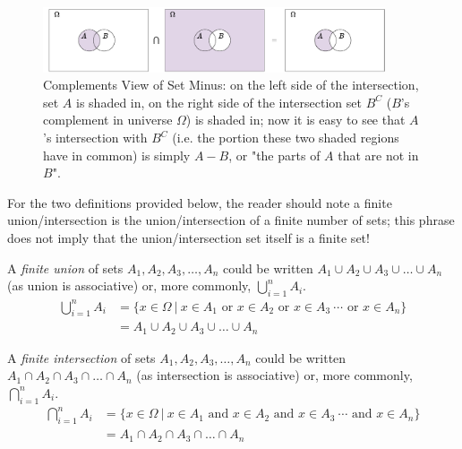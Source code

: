 \begin{figure}[h!]
    \centering
    \includegraphics[width=0.9\textwidth]{Figures/Complements View of Set Minus.pdf}
    \caption{Complements View of Set Minus: on the left side of the intersection, set $A$ is shaded in, on the right side of the intersection set $B^C$ ($B$'s complement in universe $\Omega$) is shaded in; now it is easy to see that $A$'s intersection with $B^C$ (i.e. the portion these two shaded regions have in common) is simply $A-B$, or "the parts of $A$ that are not in $B$".}
    \label{fig:complements_view_set_minus}
\end{figure}
\newpage
\noindent For the two definitions provided below, the reader should note a finite union/intersection is the union/intersection of a finite number of sets; this phrase does not imply that the union/intersection set itself is a finite set!

\begin{definition}
    A \textit{finite union} of sets $A_1, A_2, A_3, \dots , A_n$ could be written $A_1 \cup A_2 \cup A_3 \cup \dots \cup A_n$ (as union is associative) or, more commonly, $\bigcup_{i=1}^n A_i$. 
\begin{align}
    \bigcup_{i=1}^n A_i &= \{x\in \Omega \ | \ x\in A_1 \text{ or } x \in A_2 \text{ or } x\in A_3 \  \cdots \text{ or } x\in A_n\} \nonumber \\
    &= A_1 \cup A_2 \cup A_3 \cup \dots \cup A_n \nonumber 
\end{align}
\end{definition}

\begin{definition}
    A \textit{finite intersection} of sets $A_1, A_2, A_3, \dots , A_n$ could be written $A_1 \cap A_2 \cap A_3 \cap \dots \cap A_n$ (as intersection is associative) or, more commonly, $\bigcap_{i=1}^n A_i$. 
\begin{align}
    \bigcap_{i=1}^n A_i &= \{x\in \Omega \ | \ x\in A_1 \text{ and } x \in A_2 \text{ and } x\in A_3 \ \cdots \text{ and } x\in A_n\} \nonumber \\
    &= A_1 \cap A_2 \cap A_3 \cap \dots \cap A_n \nonumber 
\end{align}
\end{definition}

